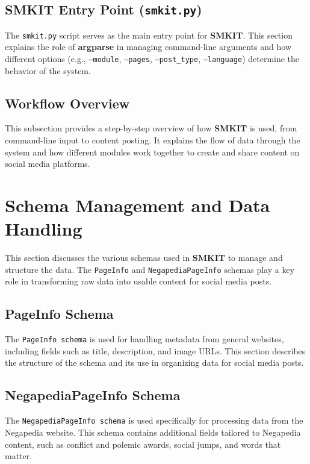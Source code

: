 \subsection{SMKIT Entry Point (\texttt{smkit.py})}
\label{subsec:smkit_entry_point_smkit_py}
The \texttt{smkit.py} script serves as the main entry point for \textbf{SMKIT}. This section explains the role of \textbf{argparse} in managing command-line arguments and how different options (e.g., \texttt{--module}, \texttt{--pages}, \texttt{--post\_type}, \texttt{--language}) determine the behavior of the system.

\subsection{Workflow Overview}
\label{subsec:workflow_overview}
This subsection provides a step-by-step overview of how \textbf{SMKIT} is used, from command-line input to content posting. It explains the flow of data through the system and how different modules work together to create and share content on social media platforms.

\section{Schema Management and Data Handling}
\label{sec:schema_management_and_data_handling}
This section discusses the various schemas used in \textbf{SMKIT} to manage and structure the data. The \texttt{PageInfo} and \texttt{NegapediaPageInfo} schemas play a key role in transforming raw data into usable content for social media posts.

\subsection{PageInfo Schema}
\label{subsec:pageinfo_schema}
The \texttt{PageInfo schema} is used for handling metadata from general websites, including fields such as title, description, and image URLs. This section describes the structure of the schema and its use in organizing data for social media posts.

\subsection{NegapediaPageInfo Schema}
\label{subsec:negapediapageinfo_schema}
The \texttt{NegapediaPageInfo schema} is used specifically for processing data from the Negapedia website. This schema contains additional fields tailored to Negapedia content, such as conflict and polemic awards, social jumps, and words that matter.

